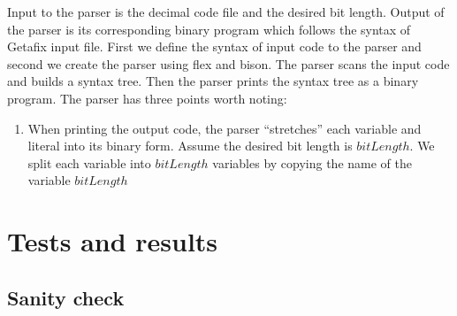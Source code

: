 Input to the parser is the decimal code file and the desired bit length. Output of the parser is its corresponding binary program which follows the syntax of Getafix input file. First we define the syntax of input code to the parser and second we create the parser using flex and bison. The parser scans the input code and builds a syntax tree. Then the parser prints the syntax tree as a binary program. The parser has three points worth noting:

\begin{enumerate}
\item When printing the output code, the parser ``stretches'' each variable and literal into its binary form. Assume the desired bit length is $bitLength$. We split each variable into $bitLength$ variables by copying the name of the variable $bitLength$ 
\end{enumerate}

\section{Tests and results}
\subsection{Sanity check}

